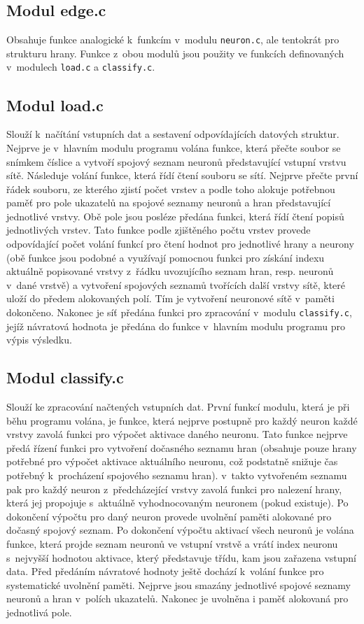 \documentclass[12pt, a4paper, titlepage]{report}
\begin{document}
\subsection{Modul edge.c}
Obsahuje funkce analogické k~funkcím v~modulu \texttt{neuron.c}, ale tentokrát pro strukturu hrany. Funkce z~obou modulů jsou použity ve funkcích definovaných v~modulech \texttt{load.c} a \texttt{classify.c}.
\subsection{Modul load.c}
Slouží k~načítání vstupních dat a sestavení odpovídajících datových struktur. Nejprve je v~hlavním modulu programu volána funkce, která přečte soubor se snímkem číslice a vytvoří spojový seznam neuronů představující vstupní vrstvu sítě. Následuje volání funkce, která řídí čtení souboru se sítí. Nejprve přečte první řádek souboru, ze kterého zjistí počet vrstev a podle toho alokuje potřebnou paměť pro pole ukazatelů na spojové seznamy neuronů a hran představující jednotlivé vrstvy. Obě pole jsou posléze předána funkci, která řídí čtení popisů jednotlivých vrstev. Tato funkce podle zjištěného počtu vrstev provede odpovídající počet volání funkcí pro čtení hodnot pro jednotlivé hrany a neurony (obě funkce jsou podobné a využívají pomocnou funkci pro získání indexu aktuálně popisované vrstvy z~řádku uvozujícího seznam hran, resp. neuronů v~dané vrstvě) a vytvoření spojových seznamů tvořících další vrstvy sítě, které uloží do předem alokovaných polí. Tím je vytvoření neuronové sítě v~paměti dokončeno. Nakonec je síť předána funkci pro zpracování v~modulu \texttt{classify.c}, jejíž návratová hodnota je předána do funkce v~hlavním modulu programu pro výpis výsledku.
\subsection{Modul classify.c}
Slouží ke zpracování načtených vstupních dat. První funkcí modulu, která je při běhu programu volána, je funkce, která nejprve postupně pro každý neuron každé vrstvy zavolá funkci pro výpočet aktivace daného neuronu. Tato funkce nejprve předá řízení funkci pro vytvoření dočasného seznamu hran (obsahuje pouze hrany potřebné pro výpočet aktivace aktuálního neuronu, což podstatně snižuje čas potřebný k~procházení spojového seznamu hran). v~takto vytvořeném seznamu pak pro každý neuron z~předcházející vrstvy zavolá funkci pro nalezení hrany, která jej propojuje s~aktuálně vyhodnocovaným neuronem (pokud existuje). Po dokončení výpočtu pro daný neuron provede uvolnění paměti alokované pro dočasný spojový seznam. Po dokončení výpočtu aktivací všech neuronů je volána funkce, která projde seznam neuronů ve vstupní vrstvě a vrátí index neuronu s~nejvyšší hodnotou aktivace, který představuje třídu, kam jsou zařazena vstupní data. Před předáním návratové hodnoty ještě dochází k~volání funkce pro systematické uvolnění paměti. Nejprve jsou smazány jednotlivé spojové seznamy neuronů a hran v~polích ukazatelů. Nakonec je uvolněna i paměť alokovaná pro jednotlivá pole.
\end{document}
